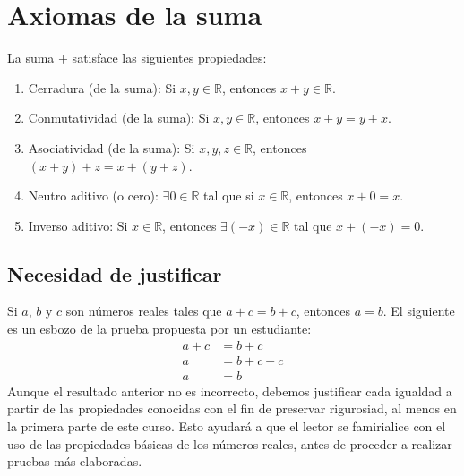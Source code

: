 \documentclass[11pt]{article}
\newcommand{\R}{\mathbb{R}}
\begin{document}
\section*{Axiomas de la suma}
La suma $+$ satisface las siguientes propiedades:
\begin{enumerate}%
 \item Cerradura (de la suma): Si $x,y\in \R$, entonces $x+y \in \R$.

 \item Conmutatividad (de la suma): Si $x, y\in \R$, entonces $x+y =y+x$.

 \item Asociatividad (de la suma): Si $x, y, z\in \R$, entonces $(x+y)+z = x+(y+z)$.
 \item Neutro aditivo (o cero): $\exists 0\in \R$ tal que si $x\in \R$, entonces $x+0=x$.
 \item Inverso aditivo: Si $x\in \R$, entonces $\exists (-x)\in \R$ tal que $x+(-x)=0$.
\end{enumerate}

\subsection*{Necesidad de justificar}

Si $a$, $b$ y $c$ son números reales tales que $a+c=b+c$, entonces $a=b$. El siguiente es un esbozo de la prueba propuesta por un estudiante: \begin{align*}
 a+c &= b+c\\
 a &= b+c-c\\
 a &= b \end{align*}
Aunque el resultado anterior no es incorrecto, debemos justificar cada igualdad a partir de las propiedades conocidas con el fin de preservar rigurosiad, al menos en la primera parte de este curso. Esto ayudará a que el lector se famirialice con el uso de las propiedades básicas de los números reales, antes de proceder a realizar pruebas más elaboradas.
\end{document}
